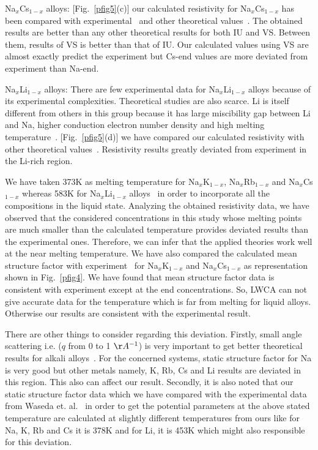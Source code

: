 \documentclass[final12pt]{elsarticle}
\begin{document}
Na$_{x}$Cs$_{1-x}$ alloys: [Fig.~\ref{pfig5}(c)] our calculated resistivity for Na$_{x}$Cs$_{1-x}$ has been compared with experimental~\cite{Hallers1974} and other theoretical values~\cite{Vora2007,Mishra1990,Wang1980,Singh1991,Malan2018}. The obtained results are better than any other theoretical results for both IU and VS. Between them, results of VS is better than that of IU. Our calculated values using VS are almost exactly predict the experiment but Cs-end values are more deviated from experiment than Na-end.
 
Na$_{x}$Li$_{1-x}$ alloys: There are few experimental data for Na$_{x}$Li$_{1-x}$ alloys because of its experimental complexities. Theoretical studies are also scarce. Li is itself different from others in this group because it has large miscibility gap between Li and Na, higher conduction electron number density and high melting temperature~\cite{feitsma1975}. [Fig.~\ref{pfig5}(d)] we have compared our calculated resistivity with other theoretical values~\cite{Vora2007, Mishra1990,Malan2018}. Resistivity results greatly deviated from experiment in the Li-rich region. 

We have taken 373K as melting temperature for Na$_x$K$_{1-x}$, Na$_x$Rb$_{1-x}$ and Na$_x$Cs$_{1-x}$ whereas 583K for Na$_x$Li$_{1-x}$ alloys~\cite{Bale} in order to incorporate all the compositions in the liquid state. Analyzing the obtained resistivity data, we have observed that the considered concentrations in this study whose melting points are much smaller than the calculated temperature provides deviated results than the experimental ones. Therefore, we can infer that the applied theories work well at the near melting temperature. We have also compared the calculated mean structure factor with experiment~\cite{Alblas1,Alblas2,Alblas3,Hujiben1979} for Na$_x$K$_{1-x}$ and Na$_x$Cs$_{1-x}$ as representation shown in Fig.~\ref{pfig4}. We have found that mean structure factor data is consistent with experiment except at the end concentrations. So, LWCA can not give accurate data for the temperature which is far from melting for liquid alloys. Otherwise our results are consistent with the experimental result.

There are other things to consider regarding this deviation. Firstly, small angle scattering i.e. ($q$ from 0 to 1 $\AA^{-1}$) is very important to get better theoretical results for alkali alloys~\cite{Faber2010}. For the concerned systems, static structure factor for Na is very good but other metals namely, K, Rb, Cs and Li results are deviated in this region. This also can affect our result. Secondly, it is also noted that our static structure factor data which we have compared with the experimental data from Waseda et. al.~\cite{Waseda} in order to get the potential parameters at the above stated temperature are calculated at slightly different temperatures from ours like for Na, K, Rb and Cs it is 378K and for Li, it is 453K which might also responsible for this deviation.
\end{document}
